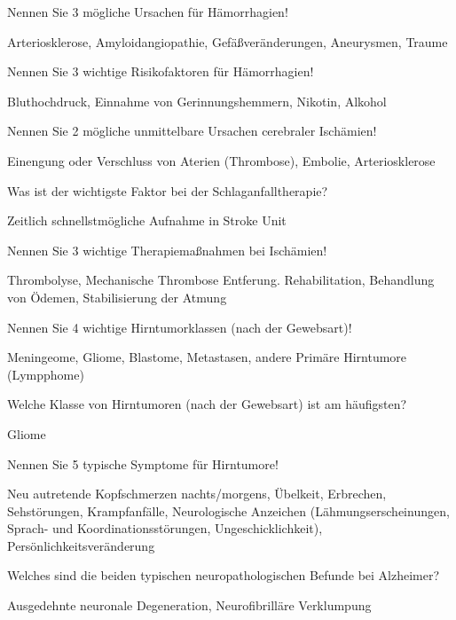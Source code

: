 \documentclass[10pt, a4paper]{exam}
\begin{document}
\begin{questions}
  \question Nennen Sie 3 mögliche Ursachen für Hämorrhagien!
  \begin{solution}
    Arteriosklerose, Amyloidangiopathie, Gefäßveränderungen, Aneurysmen, Traume
  \end{solution}

  \question Nennen Sie 3 wichtige Risikofaktoren für Hämorrhagien!
  \begin{solution}
    Bluthochdruck, Einnahme von Gerinnungshemmern, Nikotin, Alkohol
  \end{solution}

  \question Nennen Sie 2 mögliche unmittelbare Ursachen cerebraler Ischämien!
  \begin{solution}
    Einengung oder Verschluss von Aterien (Thrombose), Embolie, Arteriosklerose
  \end{solution}

  \question Was ist der wichtigste Faktor bei der Schlaganfalltherapie?
  \begin{solution}
    Zeitlich schnellstmögliche Aufnahme in Stroke Unit
  \end{solution}

  \question Nennen Sie 3 wichtige Therapiemaßnahmen bei Ischämien!
  \begin{solution}
    Thrombolyse, Mechanische Thrombose Entferung. Rehabilitation, Behandlung von Ödemen, Stabilisierung der Atmung
  \end{solution}

  \question Nennen Sie 4 wichtige Hirntumorklassen (nach der Gewebsart)!
  \begin{solution}
    Meningeome, Gliome, Blastome, Metastasen, andere Primäre Hirntumore (Lympphome)
  \end{solution}

  \question Welche Klasse von Hirntumoren (nach der Gewebsart) ist am häufigsten?
  \begin{solution}
    Gliome
  \end{solution}

  \question Nennen Sie 5 typische Symptome für Hirntumore!
  \begin{solution}
    Neu autretende Kopfschmerzen nachts/morgens, Übelkeit, Erbrechen, Sehstörungen, Krampfanfälle, Neurologische Anzeichen (Lähmungserscheinungen, Sprach- und Koordinationsstörungen,
    Ungeschicklichkeit), Persönlichkeitsveränderung
  \end{solution}

  \question Welches sind die beiden typischen neuropathologischen Befunde bei Alzheimer?
  \begin{solution}
    Ausgedehnte neuronale Degeneration, Neurofibrilläre Verklumpung
  \end{solution}


\end{questions}
\end{document}
